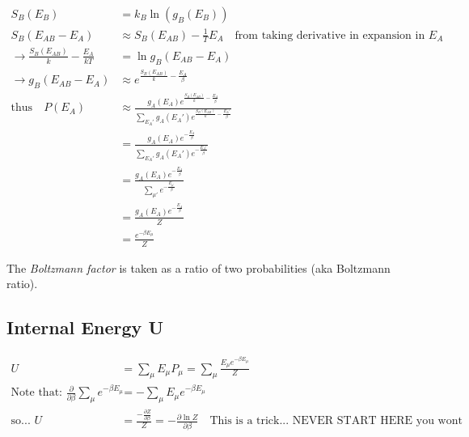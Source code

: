 \documentclass[a4paper, 11pt]{article}
\begin{document}
\begin{align*}
	S_B(E_B) &= k_B \ln(g_B(E_B)) \\
	S_B(E_{AB}-E_A) &\approx S_B(E_{AB})- \frac{1}{T}E_A \quad \text{from taking derivative in expansion in }E_A \\ 
	\rightarrow \frac{S_B(E_{AB})}{k}-\frac{E_A}{kT} &= \ln g_B(E_{AB}-E_A) \\ 
	\rightarrow g_B(E_{AB}-E_A) &\approx e^{\frac{S_B(E_{AB})}{k}-\frac{E_A}{\beta}}\\
	\text{thus} \quad P(E_A) &\approx \frac{g_A(E_A)e^{\frac{S_B(E_{AB})}{k}-\frac{E_A}{\beta}}}{\sum\limits_{E_A'}g_A(E_A')e^{\frac{S_B(E_{AB})}{k}-\frac{E_A'}{\beta}}} \\ 
		&=\frac{g_A(E_A)e^{-\frac{E_A}{\beta}}}{\sum\limits_{E_A'}g_A(E_A')e^{-\frac{E_A'}{\beta}}} \\
		&= \frac{g_A(E_A)e^{-\frac{E_A}{\beta}}}{\sum\limits_{\mu'}e^{-\frac{E_{\mu'}}{\beta}}} \\
		&= \frac{g_A(E_A)e^{-\frac{E_A}{\beta}}}{Z} \\
		&= \frac{e^{-\beta E_\mu}}{Z} 
\end{align*}	

The \textit{Boltzmann factor} is taken as a ratio of two probabilities (aka Boltzmann ratio). 


\subsection*{Internal Energy U} 
	\begin{align*}
		U &= \sum\limits_\mu E_\mu P_\mu = \sum\limits_\mu\frac{E_\mu e^{-\beta E_\mu}}{Z} \\
		\text{Note that: } \frac{\partial}{\partial \beta}\sum\limits_\mu e^{-\beta E_\mu} &= -\sum\limits_\mu E_\mu e^{-\beta E_\mu} \\ 
		\text{so... } U&= \frac{-\frac{\partial Z}{\partial \beta}}{Z} = -\frac{\partial \ln Z}{\partial \beta} \quad \text{This is a trick... NEVER START HERE you wont remember it} 
	\end{align*}
	
\end{document}
